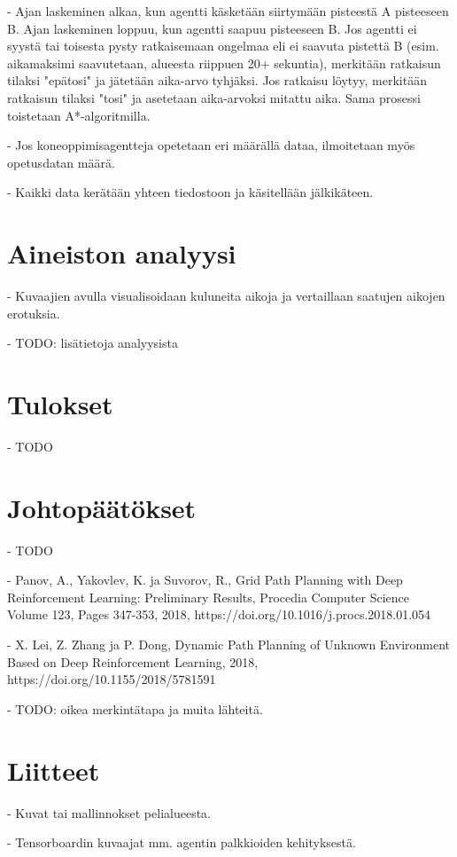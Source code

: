 \documentclass[utf8]{gradu3}
\begin{document}
- Ajan laskeminen alkaa, kun agentti käsketään siirtymään pisteestä A pisteeseen B.
Ajan laskeminen loppuu, kun agentti saapuu pisteeseen B. Jos agentti ei syystä tai toisesta
pysty ratkaisemaan ongelmaa eli ei saavuta pistettä B (esim. aikamaksimi saavutetaan, alueesta riippuen 20+ sekuntia), merkitään ratkaisun tilaksi "epätosi"
ja jätetään aika-arvo tyhjäksi. Jos ratkaisu löytyy, merkitään ratkaisun tilaksi "tosi" ja
asetetaan aika-arvoksi mitattu aika. Sama prosessi toistetaan A*-algoritmilla.

- Jos koneoppimisagentteja opetetaan eri määrällä dataa, ilmoitetaan myös opetusdatan määrä.

- Kaikki data kerätään yhteen tiedostoon ja käsitellään jälkikäteen.

\chapter{Aineiston analyysi}

- Kuvaajien avulla visualisoidaan kuluneita aikoja ja vertaillaan saatujen aikojen erotuksia.

- TODO: lisätietoja analyysista

\chapter{Tulokset}

- TODO

\chapter{Johtopäätökset}

- TODO

\printbibliography

- Panov, A., Yakovlev, K. ja Suvorov, R., Grid Path Planning with Deep
Reinforcement Learning: Preliminary Results, Procedia Computer Science
Volume 123, Pages 347-353, 2018,
https://doi.org/10.1016/j.procs.2018.01.054

- X. Lei, Z. Zhang ja P. Dong, Dynamic Path Planning of Unknown
Environment Based on Deep Reinforcement Learning, 2018,
https://doi.org/10.1155/2018/5781591

- TODO: oikea merkintätapa ja muita lähteitä.

\chapter{Liitteet}

- Kuvat tai mallinnokset pelialueesta.

- Tensorboardin kuvaajat mm. agentin palkkioiden kehityksestä.
\end{document}
